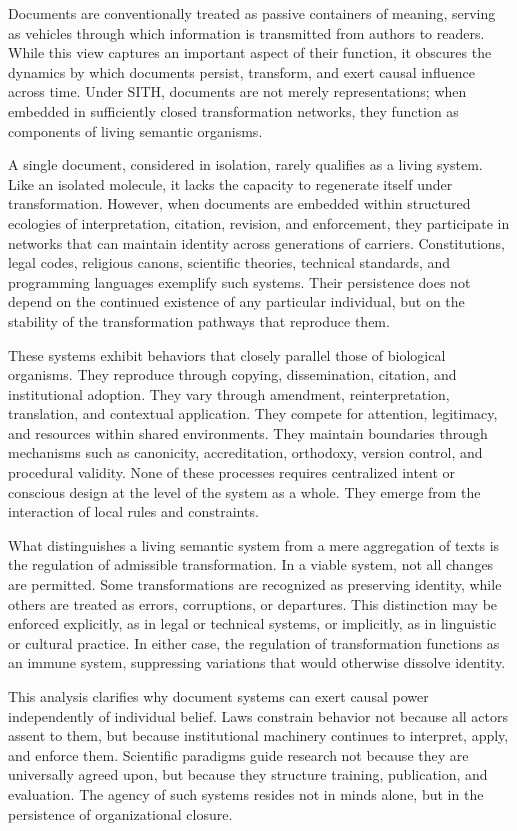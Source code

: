 \documentclass[11pt,oneside]{article}
\begin{document}
Documents are conventionally treated as passive containers of meaning, serving as vehicles through which information is transmitted from authors to readers. While this view captures an important aspect of their function, it obscures the dynamics by which documents persist, transform, and exert causal influence across time. Under SITH, documents are not merely representations; when embedded in sufficiently closed transformation networks, they function as components of living semantic organisms.

A single document, considered in isolation, rarely qualifies as a living system. Like an isolated molecule, it lacks the capacity to regenerate itself under transformation. However, when documents are embedded within structured ecologies of interpretation, citation, revision, and enforcement, they participate in networks that can maintain identity across generations of carriers. Constitutions, legal codes, religious canons, scientific theories, technical standards, and programming languages exemplify such systems. Their persistence does not depend on the continued existence of any particular individual, but on the stability of the transformation pathways that reproduce them.

These systems exhibit behaviors that closely parallel those of biological organisms. They reproduce through copying, dissemination, citation, and institutional adoption. They vary through amendment, reinterpretation, translation, and contextual application. They compete for attention, legitimacy, and resources within shared environments. They maintain boundaries through mechanisms such as canonicity, accreditation, orthodoxy, version control, and procedural validity. None of these processes requires centralized intent or conscious design at the level of the system as a whole. They emerge from the interaction of local rules and constraints.

What distinguishes a living semantic system from a mere aggregation of texts is the regulation of admissible transformation. In a viable system, not all changes are permitted. Some transformations are recognized as preserving identity, while others are treated as errors, corruptions, or departures. This distinction may be enforced explicitly, as in legal or technical systems, or implicitly, as in linguistic or cultural practice. In either case, the regulation of transformation functions as an immune system, suppressing variations that would otherwise dissolve identity.

This analysis clarifies why document systems can exert causal power independently of individual belief. Laws constrain behavior not because all actors assent to them, but because institutional machinery continues to interpret, apply, and enforce them. Scientific paradigms guide research not because they are universally agreed upon, but because they structure training, publication, and evaluation. The agency of such systems resides not in minds alone, but in the persistence of organizational closure.
\end{document}
